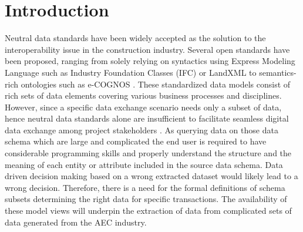 \documentclass[Journal, InsideFigs, DoubleSpace]{ascelike} %
\begin{document}
\section{Introduction}%
Neutral data standards have been widely accepted as the solution to the interoperability issue in the construction industry. Several open standards have been proposed, ranging from solely relying on syntactics using Express Modeling Language such as Industry Foundation Classes (IFC) \cite{buildingsmartIFC} or LandXML \cite{landxmlorg} to semantics-rich ontologies such as e-COGNOS \cite{Lima05}. These standardized data models consist of rich sets of data elements covering various business processes and disciplines. However, since a specific data exchange scenario needs only a subset of data, hence neutral data standards alone are insufficient to facilitate seamless digital data exchange among project stakeholders \cite{Froese03,east12}. As querying data on those data schema which are large and complicated the end user is required to have considerable programming skills and properly understand the structure and the meaning of each entity or attribute included in the source data schema. Data driven decision making based on a wrong extracted dataset would likely lead to a wrong decision. Therefore, there is a need for the formal definitions of schema subsets determining the right data for specific transactions. The availability of these model views will underpin the extraction of data from complicated sets of data generated from the AEC industry. 
\par
\end{document}
